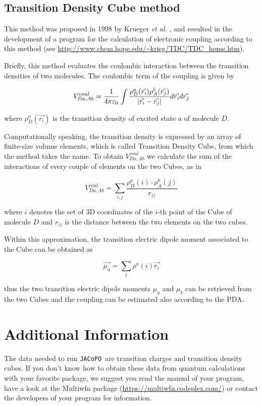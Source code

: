 \documentclass[a4paper]{article}
\newcommand{\jacopo}{\texttt{JACoPO}}
\DeclarePairedDelimiter\norm{\lvert}{\rvert}
\begin{document}
\subsection*{Transition Density Cube method}
This method was proposed in 1998 by Krueger \textit{et al.} \cite{Krueger1998}, and resulted in the development of a program for the calculation of electronic coupling according to this method (see \url{http://www.chem.hope.edu/~krieg/TDC/TDC_home.htm}).

Briefly, this method evaluates the coulombic interaction between the transition densities of two molecules. The coulombic term of the coupling is given by

\begin{equation}
 V^{coul}_{Da,Ab} = \frac{1}{4\pi\varepsilon_0} \int \frac{\rho_D^a(\vec{r_i})\rho_A^b(\vec{r_j})}{\norm{\vec{r_i} - \vec{r_j}}} d\vec{r_i} d\vec{r_j}
 \label{eq:TDC}
\end{equation}

where $\rho_D^a(\vec{r_i})$ is the transition density of excited state $a$ of molecule $D$.

Computationally speaking, the transition density is expressed by an array of finite-size volume elements, which is called Transition Density Cube, from which the method takes the name. To obtain $V^{coul}_{Da,Ab}$ we calculate the sum of the interactions of every couple of elements on the two Cubes, as in

\begin{equation}
 V^{coul}_{Da,Ab} = \sum_{i,j} \frac{\rho_D^a(i)\cdot \rho_A^b(j)}{r_{ij}}
 \label{eq:TDC1}
\end{equation}

where $i$ denotes the set of 3D coordinates of the $i$-th point of the Cube of molecule $D$ and $r_{ij}$ is the distance between the two elements on the two cubes.

Within this approximation, the transition electric dipole moment associated to the Cube can be obtained as

\begin{equation}
 \vec{\mu_a} = \sum_i \rho^a(i) \vec{r_i}
 \label{eq:mu_TDC}
\end{equation}

thus the two transition electric dipole moments $\mu_a$ and $\mu_b$ can be retrieved from the two Cubes and the coupling can be estimated also according to the PDA.

\section*{Additional Information}
The data needed to run \jacopo\ are transition charges and transition density cubes. If you don't know how to obtain these data from quantum calculations with your favorite package, we suggest you read the manual of your program, have a look at the Multiwfn package (\url{https://multiwfn.codeplex.com/}) or contact the developers of your program for information.
\end{document}
